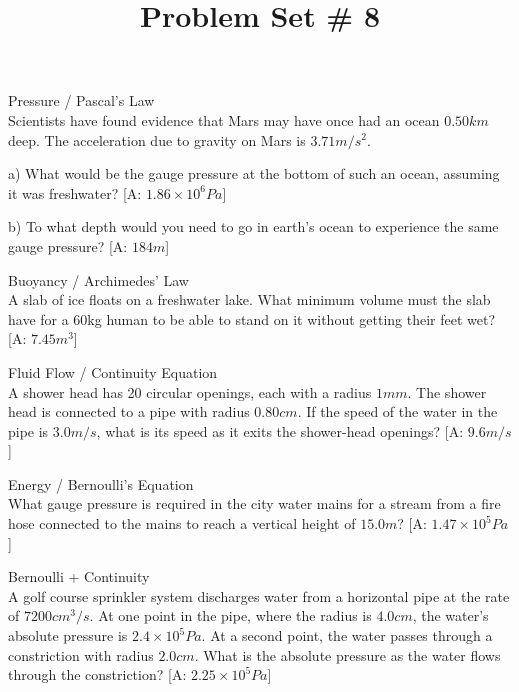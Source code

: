 \documentclass[10pt]{article}
\newenvironment{problem}[2][Problem]{\begin{trivlist}
\item[\hskip \labelsep {\bfseries #1}\hskip \labelsep {\bfseries #2.}]}{\end{trivlist}}
\begin{document}
 \title{Problem Set \# 8}
 \author{}
\date{}
\maketitle

\begin{problem}{1} Pressure / Pascal's Law\\
Scientists have found evidence that Mars may have once had an ocean $0.50km$ deep. The acceleration due to gravity on Mars is $3.71 m/s^2$.
\item a) What would be the gauge pressure at the bottom of such an ocean, assuming it was freshwater? [A: $1.86 \times 10^6 Pa$]
\item b) To what depth would you need to go in earth's ocean to experience the same gauge pressure? [A: $184m$]
\end{problem}

\begin{problem}{2} Buoyancy / Archimedes' Law\\
A slab of ice floats on a freshwater lake. What minimum volume must the slab have for a 60kg human to be able to stand on it without getting their feet wet? [A: $7.45 m^3$]
\end{problem}

\begin{problem}{3} Fluid Flow / Continuity Equation\\
A shower head has 20 circular openings, each with a radius $1mm$. The shower head is connected to a pipe with radius $0.80cm$. If the speed of the water in the pipe is $3.0m/s$, what is its speed as it exits the shower-head openings? [A: $9.6m/s$]
\end{problem}

\begin{problem}{4} Energy / Bernoulli's Equation\\
What gauge pressure is required in the city water mains for a stream from a fire hose connected to the mains to reach a vertical height of $15.0m$? [A: $1.47\times 10^5 Pa$]
\end{problem}

\begin{problem}{5} Bernoulli + Continuity\\
A golf course sprinkler system discharges water from a horizontal pipe at the rate of $7200 cm^3/s$. At one point in the pipe, where the radius is $4.0cm$, the water's absolute pressure is $2.4\times 10^5 Pa$. At a second point, the water passes through a constriction with radius $2.0cm$. What is the absolute pressure as the water flows through the constriction? [A: $2.25\times 10^5 Pa$]
\end{problem}


\end{document}

